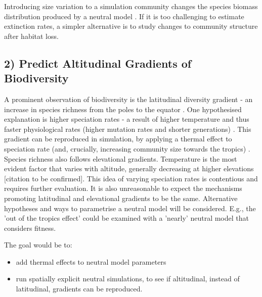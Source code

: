 \documentclass[11pt]{article}
\begin{document}
Introducing size variation to a simulation community changes the species biomass distribution produced by a neutral model \cite{o2009integrative}. If it is too challenging to estimate extinction rates, a simpler alternative is to study changes to community structure after habitat loss.

\subsection*{2) Predict Altitudinal Gradients of Biodiversity}
A prominent observation of biodiversity is the latitudinal diversity gradient - an increase in species richness from the poles to the equator \cite{tittensor2016neutral}. One hypothesised explanation is higher speciation rates - a result of higher temperature and thus faster physiological rates (higher mutation rates and shorter generations) \cite{sibly2012metabolic}. This gradient can be reproduced in simulation, by applying a thermal effect to speciation rate (and, crucially, increasing community size towards the tropics) \cite{tittensor2016neutral}. Species richness also follows elevational gradients. Temperature is the most evident factor that varies with altitude, generally decreasing at higher elevations [citation to be confirmed]. This idea of varying speciation rates is contentious and requires further evaluation. It is also unreasonable to expect the mechanisms promoting latitudinal and elevational gradients to be the same. Alternative hypotheses and ways to parametrise a neutral model will be considered. E.g., the 'out of the tropics effect' \cite{Jablonski102} could be examined with a 'nearly' neutral model that considers fitness.

The goal would be to:
\begin{itemize}
	\item add thermal effects to neutral model parameters
	\item run spatially explicit neutral simulations, to see if altitudinal, instead of latitudinal, gradients can be reproduced.
\end{itemize}
\end{document}
